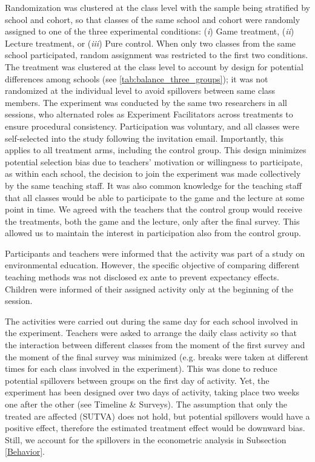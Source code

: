 \documentclass[preprint,12pt]{elsarticle}
\begin{document}
Randomization was clustered at the class level with the sample being stratified by school and cohort, so that classes of the same school and cohort were randomly assigned to one of the three experimental conditions: (\textit{i}) Game treatment, (\textit{ii}) Lecture treatment, or (\textit{iii}) Pure control. When only two classes from the same school participated, random assignment was restricted to the first two conditions. The treatment was clustered at the class level to account by design for potential differences among schools (see \ref{tab:balance_three_groups}); it was not randomized at the individual level to avoid spillovers between same class members.
The experiment was conducted by the same two researchers in all sessions, who alternated roles as Experiment Facilitators across treatments to ensure procedural consistency. Participation was voluntary, and all classes were self-selected into the study following the invitation email. Importantly, this applies to all treatment arms, including the control group. This design minimizes potential selection bias due to teachers’ motivation or willingness to participate, as within each school, the decision to join the experiment was made collectively by the same teaching staff. It was also common knowledge for the teaching staff that all classes would be able to participate to the game and the lecture at some point in time. We agreed with the teachers that the control group would receive the treatments, both the game and the lecture, only after the final survey. This allowed us to maintain the interest in participation also from the control group.


Participants and teachers were informed that the activity was part of a study on environmental education. However, the specific objective of comparing different teaching methods was not disclosed ex ante to prevent expectancy effects. Children were informed of their assigned activity only at the beginning of the session.


The activities were carried out during the same day for each school involved in the experiment. Teachers were asked to arrange the daily class activity so that the interaction between different classes from the moment of the first survey and the moment of the final survey was minimized (e.g. breaks were taken at different times for each class involved in the experiment). This was done to reduce potential spillovers between groups on the first day of activity. Yet, the experiment has been designed over two days of activity, taking place two weeks one after the other (see Timeline \& Surveys).
The assumption that only the treated are affected (SUTVA) does not hold, but potential spillovers would have a positive effect, therefore the estimated treatment effect would be downward bias. Still, we account for the spillovers in the econometric analysis in Subsection \ref{Behavior}.
\end{document}
